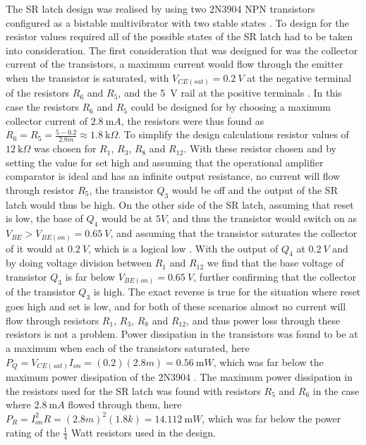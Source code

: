 The SR latch design was realised by using two 2N3904 NPN transistors configured as a bistable multivibrator with two stable states \cite{NPNSRlatch}. To design for the resistor values required all of the possible states of the SR latch had to be taken into consideration. The first consideration that was designed for was the collector current of the transistors, a maximum current would flow through the emitter when the transistor is saturated, with $V_{CE(sat)}=\SI{0.2}{V}$ at the negative terminal of the resistors $R_6$ and $R_5$, and the \SI{5}{V} rail at the positive terminals \cite{2N3904:2003}. In this case the resistors $R_6$ and $R_5$ could be designed for by choosing a maximum collector current of $\SI{2.8}{\milli A}$, the resistors were thus found as $R_6=R_5=\frac{5-0.2}{2.8m}\approx \SI{1.8}{\kilo \Omega}$. \vspace{4mm} \newline To simplify the design calculations resistor values of $\SI{12}{\kilo \Omega}$ was chosen for $R_1$, $R_3$, $R_8$ and $R_{12}$. With these resistor chosen and by setting the value for set high and assuming that the operational amplifier comparator is ideal and has an infinite output resistance, no current will flow through resistor $R_5$, the transistor $Q_3$ would be off and the output of the SR latch would thus be high. On the other side of the SR latch, assuming that reset is low, the base of $Q_4$ would be at $5V$, and thus the transistor would switch on as $V_{BE}>V_{BE(on)}=\SI{0.65}{V}$, and assuming that the transistor saturates the collector of it would at $\SI{0.2}{V}$, which is a logical low \cite{2N3904:2003}. With the output of $Q_4$ at $\SI{0.2}{V}$ and by doing voltage division between $R_1$ and $R_{12}$ we find that the base voltage of transistor $Q_3$ is far below $V_{BE(on)}=\SI{0.65}{V}$, further confirming that the collector of the transistor $Q_3$ is high. The exact reverse is true for the situation where reset goes high and set is low, and for both of these scenarios almost no current will flow through resistors $R_1$, $R_3$, $R_8$ and $R_{12}$, and thus power loss through these resistors is not a problem. Power dissipation in the transistors was found to be at a maximum when each of the transistors saturated, here $P_{Q}=V_{CE(sat)}I_{on}=(0.2)(2.8m)=\SI{0.56}{\milli W}$, which was far below the maximum power dissipation of the 2N3904 \cite{2N3904:2003}. The maximum power dissipation in the resistors used for the SR latch was found with resistors $R_5$ and $R_6$ in the case where $\SI{2.8}{\milli A}$ flowed through them, here $P_{R}=I_{on}^2R=(2.8m)^2(1.8k)=\SI{14.112}{\milli W}$, which was far below the power rating of the $\frac{1}{4}$ Watt resistors used in the design.

